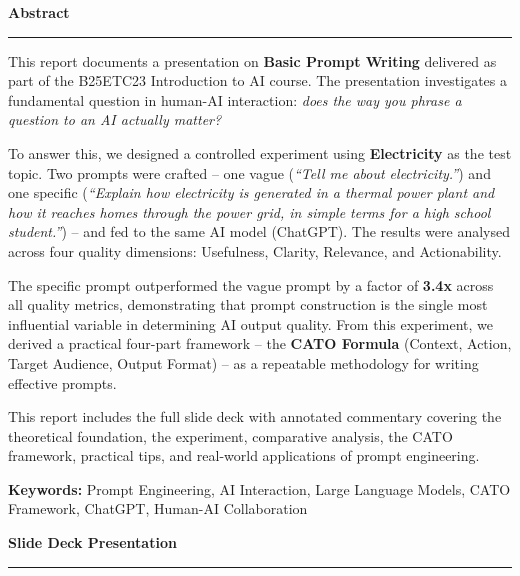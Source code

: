 \documentclass[12pt,a4paper]{article}
\begin{document}
\newpage

\label{sec:abstract}
\begin{center}
{\LARGE\bfseries\textcolor{dark}{Abstract}}\\[0.3cm]
\rule{0.4\textwidth}{0.8pt}
\end{center}

\vspace{0.5cm}

This report documents a presentation on \textbf{Basic Prompt Writing} delivered as part of the B25ETC23 Introduction to AI course. The presentation investigates a fundamental question in human-AI interaction: \emph{does the way you phrase a question to an AI actually matter?}

To answer this, we designed a controlled experiment using \textbf{Electricity} as the test topic. Two prompts were crafted -- one vague (\emph{``Tell me about electricity.''}) and one specific (\emph{``Explain how electricity is generated in a thermal power plant and how it reaches homes through the power grid, in simple terms for a high school student.''}) -- and fed to the same AI model (ChatGPT). The results were analysed across four quality dimensions: Usefulness, Clarity, Relevance, and Actionability.

The specific prompt outperformed the vague prompt by a factor of \textbf{3.4x} across all quality metrics, demonstrating that prompt construction is the single most influential variable in determining AI output quality. From this experiment, we derived a practical four-part framework -- the \textbf{CATO Formula} (Context, Action, Target Audience, Output Format) -- as a repeatable methodology for writing effective prompts.

This report includes the full slide deck with annotated commentary covering the theoretical foundation, the experiment, comparative analysis, the CATO framework, practical tips, and real-world applications of prompt engineering.

\vspace{0.5cm}
\noindent\textbf{Keywords:} Prompt Engineering, AI Interaction, Large Language Models, CATO Framework, ChatGPT, Human-AI Collaboration

\newpage

\begin{center}
{\LARGE\bfseries\textcolor{dark}{Slide Deck Presentation}}\\[0.3cm]
\rule{0.4\textwidth}{0.8pt}
\end{center}
\end{document}
